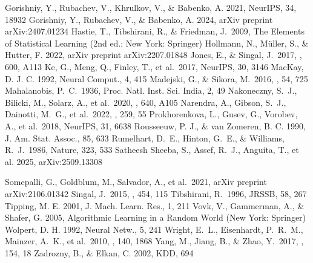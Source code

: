 \documentclass[twocolumn,linenumbers,floatfix]{aastex701}
\begin{document}
\begin{thebibliography}{}
 Gorishniy, Y., Rubachev, V., Khrulkov, V., \& Babenko, A. 2021, NeurIPS, 34, 18932
 Gorishniy, Y., Rubachev, V., \& Babenko, A. 2024, arXiv preprint arXiv:2407.01234
 Hastie, T., Tibshirani, R., \& Friedman, J.\ 2009, The Elements of Statistical Learning (2nd ed.; New York: Springer)
 Hollmann, N., M{\"u}ller, S., \& Hutter, F. 2022, arXiv preprint arXiv:2207.01848
 Jones, E., \& Singal, J.\ 2017, \aap, 600, A113
 Ke, G., Meng, Q., Finley, T., et al.\ 2017, NeurIPS, 30, 3146
 MacKay, D. J. C. 1992, Neural Comput., 4, 415
 Madejski, G., \& Sikora, M.\ 2016, \araa, 54, 725
\text{ }
 Mahalanobis, P.~C.\ 1936, Proc. Natl. Inst. Sci. India, 2, 49
 Nakoneczny, S.~J., Bilicki, M., Solarz, A., et al.\ 2020, \aap, 640, A105
 Narendra, A., Gibson, S.~J., Dainotti, M.~G., et al.\ 2022, \apjs, 259, 55
 Prokhorenkova, L., Gusev, G., Vorobev, A., et al.\ 2018, NeurIPS, 31, 6638
 Rousseeuw, P. J., \& van Zomeren, B. C. 1990, J. Am. Stat. Assoc., 85, 633
 Rumelhart, D.~E., Hinton, G.~E., \& Williams, R.~J.\ 1986, Nature, 323, 533
 Satheesh Sheeba, S., Assef, R.~J., Anguita, T., et al. 2025, arXiv:2509.13308

 Somepalli, G., Goldblum, M., Salvador, A., et al.\ 2021, arXiv preprint arXiv:2106.01342
 Singal, J.\ 2015, \mnras, 454, 115
 Tibshirani, R.\ 1996, JRSSB, 58, 267
 Tipping, M. E. 2001, J. Mach. Learn. Res., 1, 211
 Vovk, V., Gammerman, A., \& Shafer, G. 2005, Algorithmic Learning in a Random World (New York: Springer)
 Wolpert, D. H. 1992, Neural Netw., 5, 241
 Wright, E.~L., Eisenhardt, P.~R.~M., Mainzer, A.~K., et al.\ 2010, \aj, 140, 1868
 Yang, M., Jiang, B., \& Zhao, Y.\ 2017, \aj, 154, 18
 Zadrozny, B., \& Elkan, C. 2002, KDD, 694





\end{thebibliography}
\end{document}
